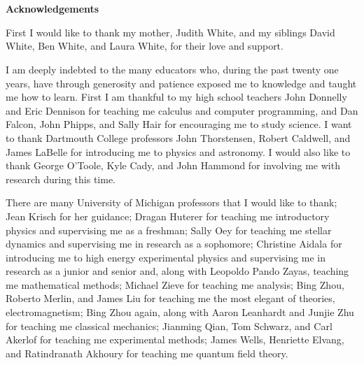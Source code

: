 \phantom{x}\\
\phantom{x}\\
\vspace{1.1em}

\begin{center}
\textbf{\LARGE Acknowledgements}
\end{center} 

First I would like to thank my mother, Judith White, and my siblings David White, Ben White, and Laura White, for their love and support.

I am deeply indebted to the many educators who, during the past twenty one years, have through generosity and patience exposed me to knowledge and taught me how to learn.
First I am thankful to my high school teachers John Donnelly and Eric Dennison for teaching me calculus and computer programming, and Dan Falcon, John Phipps, and Sally Hair for encouraging me to study science.
I want to thank Dartmouth College professors John Thorstensen, Robert Caldwell, and James LaBelle for introducing me to physics and astronomy.
I would also like to thank George O'Toole, Kyle Cady, and John Hammond for involving me with research during this time.

There are many University of Michigan professors that I would like to thank;
Jean Krisch for her guidance;
Dragan Huterer for teaching me introductory physics and supervising me as a freshman;
Sally Oey for teaching me stellar dynamics and supervising me in research as a sophomore;
Christine Aidala for introducing me to high energy experimental physics and supervising me in research as a junior and senior and, along with Leopoldo Pando Zayas, teaching me mathematical methods;
Michael Zieve for teaching me analysis;
Bing Zhou, Roberto Merlin, and James Liu for teaching me the most elegant of theories, electromagnetism;
Bing Zhou again, along with Aaron Leanhardt and Junjie Zhu for teaching me classical mechanics;
Jianming Qian, Tom Schwarz, and Carl Akerlof for teaching me experimental methods;
James Wells, Henriette Elvang, and Ratindranath Akhoury for teaching me quantum field theory.

